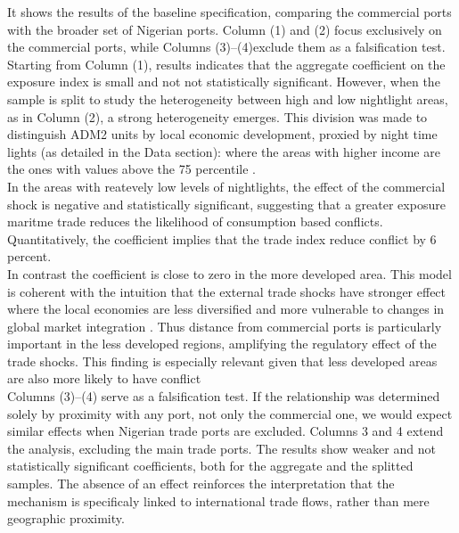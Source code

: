 It shows the results of the baseline specification, comparing the commercial ports with the broader set of Nigerian ports. 
Column (1) and (2) focus exclusively on the commercial ports, while Columns (3)–(4)exclude them as a falsification test. \\ 
Starting from Column (1), results indicates that the aggregate coefficient on the exposure index is small and not not statistically significant. However, when the sample is split to study the heterogeneity between high and low nightlight areas, as in Column (2), a strong heterogeneity emerges. This division was made to distinguish ADM2 units by local economic development, proxied by night time lights (as detailed in the Data section): where the areas with higher income are the ones with values above the 75 percentile \parencite{amodio2024trade, henderson2012measuring}. \\
In the areas with reatevely low levels of nightlights, the effect of the commercial shock is negative and statistically significant, suggesting that a greater exposure maritme trade reduces the likelihood of consumption based conflicts. Quantitatively, the coefficient implies that the trade index reduce conflict by 6 percent. \\ 
In contrast the coefficient is close to zero in the more developed area. This model is coherent with the intuition that the external trade shocks have stronger effect where the local economies are less diversified and more vulnerable to changes in global market integration \parencite{berman2015external}. Thus distance from commercial ports is particularly important in the less developed regions, amplifying the regulatory effect of the trade shocks. This finding is especially relevant given that less developed areas are also more likely to have conflict \parencite{collier2004greed, bruckner2010international} \\

Columns (3)–(4) serve as a falsification test. If the relationship was determined solely by proximity with any port, not only the commercial one, we would expect similar effects when Nigerian trade ports are excluded.
Columns 3 and 4 extend the analysis, excluding the main trade ports. The results show weaker and not statistically significant coefficients, both for the aggregate and the splitted samples.
The absence of an effect reinforces the interpretation that the mechanism is specificaly linked to international trade flows, rather than mere geographic proximity. \\

